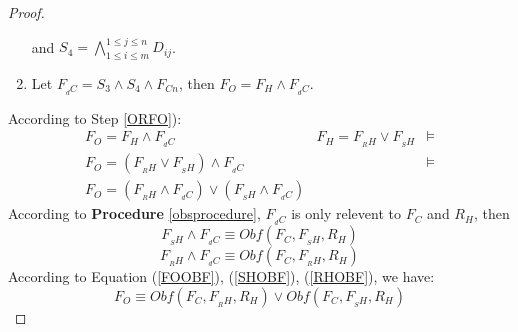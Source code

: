\documentclass[conference,compsocconf]{IEEEtran}
\begin{document}
\begin{proof}
\begin{enumerate}
\begin{itemize}
\end{itemize}
and $S_4=\bigwedge_{1\leqslant i\leqslant m}^{1\leqslant j\leqslant n} D_{ij}$.
\item\label{ORFO}
Let  $F_{_dC} =S_3\wedge S_4 \wedge F_{Cn}$, then $F_O=F_H \wedge F_{_dC}$.
\end{enumerate}
According to Step \ref{ORFO}):
\begin{equation}\label{FOOBF}
\begin{array}{ccc}
F_O  =  F_H \wedge F_{_dC}                                   &F_H=F_{_RH}\vee F_{_SH}&\models\\
F_O  =  (F_{_RH}\vee F_{_SH})\wedge F_{_dC}                  &                       &\models\\
F_O  =  (F_{_RH} \wedge F_{_dC})\vee(F_{_SH}\wedge F_{_dC})  &                       &
\end{array}
\end{equation}
According to \textbf{Procedure} \ref{obsprocedure}, $F_{_dC}$ is only relevent to $F_C$ and $R_H$, then \\
\begin{equation}\label{SHOBF}
F_{_SH} \wedge F_{_dC} \equiv Obf(F_C,F_{_SH},R_H)
\end{equation} 
\begin{equation}\label{RHOBF}
F_{_RH} \wedge F_{_dC} \equiv Obf(F_C,F_{_RH},R_H)
\end{equation} 
According to Equation (\ref{FOOBF}), (\ref{SHOBF}), (\ref{RHOBF}), we have:
 \begin{equation}
F_O \equiv Obf(F_C,F_{_RH} ,R_H)
\vee Obf(F_C,F_{_SH} ,R_H)  
 \end{equation}

\end{proof}
\end{document}
